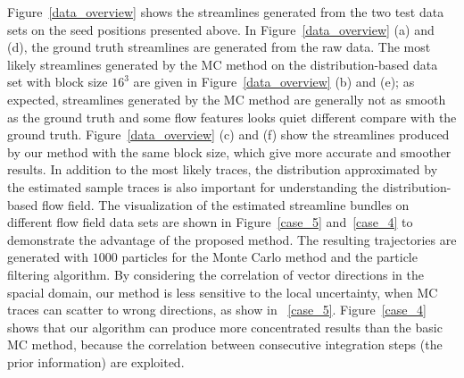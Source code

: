 Figure~\ref{data_overview} shows the streamlines generated from the two test data sets on the seed positions presented above. In Figure~\ref{data_overview} (a) and (d), the ground truth streamlines are generated from the raw data. The most likely streamlines generated by the MC method on the distribution-based data set with block size $16^3$ are given in Figure~\ref{data_overview} (b) and (e); as expected, streamlines generated by the MC method are generally not as smooth as the ground truth and some flow features looks quiet different compare with the ground truth. Figure~\ref{data_overview} (c) and (f) show the streamlines produced by our method with the same block size, which give more accurate and smoother results. In addition to the most likely traces, the distribution approximated by the estimated sample traces is also important for understanding the distribution-based flow field. The visualization of the estimated streamline bundles on different flow field data sets are shown in Figure~\ref{case_5} and~\ref{case_4} to demonstrate the advantage of the proposed method. The resulting trajectories are generated with $1000$ particles for the Monte Carlo method and the particle filtering algorithm. By considering the correlation of vector directions in the spacial domain, our method is less sensitive to the local uncertainty, when MC traces can scatter to wrong directions, as show in ~\ref{case_5}. Figure~\ref{case_4} shows that our algorithm can produce more concentrated results than the basic MC method, because the correlation between consecutive integration steps (the prior information) are exploited.

